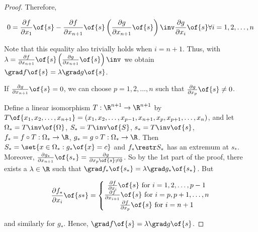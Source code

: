 \begin{proof}
    Therefore,

    \[0 = \frac{\partial f}{\partial x_1}\of{s} - \frac{\partial f}{\partial x_{n+1}}\of{s} \left(\frac{\partial g}{\partial x_{n+1}}\of{s}\right)\inv \frac{\partial g}{\partial x_i}\of{s} \forall i=1,2,\dots,n\]

    Note that this equality also trivially holds when $i = n+1$. Thus, with $\lambda = \frac{\partial f}{\partial x_{n+1}}\of{s} \left(\frac{\partial g}{\partial x_{n+1}}\of{s}\right)\inv$ we obtain $\grad f\of{s} = \lambda \grad g\of{s}$.

    If $\frac{\partial g}{\partial x_{n+1}}\of{s} = 0$, we can choose $p = 1,2,\dots,n$ such that $\frac{\partial g}{\partial x_p}\of{s} \neq 0$.

    Define a linear isomorphism $T: \R^{n+1} \to \R^{n+1}$ by $T\of{x_1,x_2,\dots,x_{n+1}} = (x_1, x_2, \dots, x_{p-1}, x_{n+1}, x_p, x_{p+1}, \dots, x_n)$, and let $\Omega_* = T\inv\of{\Omega}$, $S_* = T\inv\of{S}$, $s_* = T\inv\of{s}$, $f_* = f \circ T: \Omega_* \to \R$, $g_* = g \circ T: \Omega_* \to \R$. Then $S_* = \set{x \in \Omega_*: g_*\of{x} = c}$ and $f_* \restr S_*$ has an extremum at $s_*$. Moreover, $\frac{\partial g_*}{\partial x_{n+1}}\of{s_*} = \frac{\partial g}{\partial x_p\of{s} \neq 0}$. So by the 1st part of the proof, there exists a $\lambda \in \R$ such that $\grad f_*\of{s_*} = \lambda \grad g_* \of{s_*}$. But

    \[\frac{\partial f_*}{\partial x_i}\of{s*} = \left\{ \begin{matrix}
        \frac{\partial f}{\partial x_{i}}\of{s} \text{ for } i = 1,2,\dots,p-1 \\
        \frac{\partial f}{\partial x_{i+1}}\of{s} \text{ for } i = p,p+1,\dots,n \\
        \frac{\partial f}{\partial x_p}\of{s} \text{ for } i = n + 1
    \end{matrix} \right.\]

    and similarly for $g_*$. Hence, $\grad f\of{s} = \lambda \grad g\of{s}$.
\end{proof}

